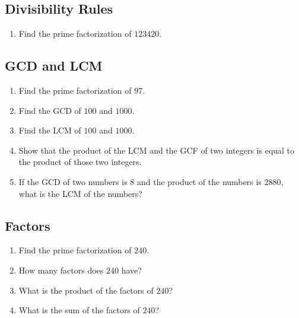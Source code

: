 \documentclass{article}
\begin{document}
\begin{multicols}{2}
	\subsection*{Divisibility Rules}
	\begin{enumerate}
		\item Find the prime factorization of $123420$.
			\vspace{3cm}
	\end{enumerate}
	
	\subsection*{GCD and LCM}
	\begin{enumerate}[resume]
		\item Find the prime factorization of $97$.
			\vspace{3cm}
		\item Find the GCD of $100$ and $1000$.
			\vspace{3cm}
		\item Find the LCM of $100$ and $1000$.
			\vspace{3cm}
		\item Show that the product of the LCM and the GCF of two integers
			is equal to the product of those two integers.
			\vspace{3cm}
		\item If the GCD of two numbers is $8$ and the product of the numbers is $2880$,
			what is the LCM of the numbers?
			\vspace{3cm}
	\end{enumerate}
	
	\subsection*{Factors}
	\begin{enumerate}[resume]
		\item Find the prime factorization of $240$.
			\vspace{3cm}
		\item How many factors does $240$ have?
			\vspace{3cm}
		\item What is the product of the factors of $240$?
			\vspace{3cm}
		\item What is the sum of the factors of $240$?
			\vspace{3cm}
	\end{enumerate}
\end{multicols}
\end{document}
